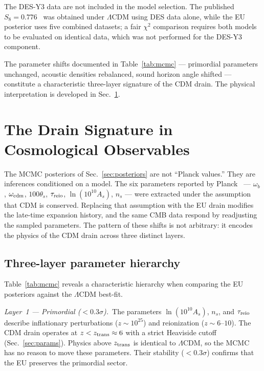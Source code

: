 \documentclass[a4paper,fleqn]{cas-dc}
\newcommand{\ztrans}{z_{\rm trans}}
\begin{document}
The DES-Y3 data are not included in the model
selection. The published
$S_8 = 0.776$~\cite{des2022} was obtained under
$\Lambda$CDM using DES data alone, while the EU posterior
uses five combined datasets; a fair $\chi^2$ comparison
requires both models to be evaluated on identical data,
which was not performed for the DES-Y3 component.

The parameter shifts documented in
Table~\ref{tab:mcmc} --- primordial parameters unchanged,
acoustic densities rebalanced, sound horizon angle shifted
--- constitute a characteristic three-layer signature of the
CDM drain. The physical interpretation is developed in
Sec.~\ref{sec:drain}.



\section{The Drain Signature in Cosmological Observables}
\label{sec:drain}

The MCMC posteriors of Sec.~\ref{sec:posteriors} are not
``Planck values.'' They are inferences conditioned on a
model. The six parameters reported by Planck~\cite{planck2018}
--- $\omega_b$, $\omega_{\rm cdm}$, $100\theta_s$,
$\tau_{\rm reio}$, $\ln(10^{10}A_s)$, $n_s$ --- were
extracted under the assumption that CDM is conserved.
Replacing that assumption with the EU drain modifies the
late-time expansion history, and the same CMB data respond
by readjusting the sampled parameters. The pattern of
these shifts is not arbitrary: it encodes the physics
of the CDM drain across three distinct layers.

\subsection{Three-layer parameter hierarchy}
\label{sec:three_layers}

Table~\ref{tab:mcmc} reveals a characteristic hierarchy
when comparing the EU posteriors against the
$\Lambda$CDM best-fit.

\textit{Layer~1 --- Primordial ($< 0.3\sigma$).}~The
parameters $\ln(10^{10}A_s)$, $n_s$, and $\tau_{\rm reio}$
describe inflationary perturbations ($z \sim 10^{25}$) and
reionization ($z \sim 6$--$10$). The CDM drain operates at
$z < \ztrans \approx 6$ with a strict Heaviside cutoff
(Sec.~\ref{sec:params}). Physics above $\ztrans$ is
identical to $\Lambda$CDM, so the MCMC has no reason to
move these parameters. Their stability ($< 0.3\sigma$)
confirms that the EU preserves the primordial sector.
\end{document}
